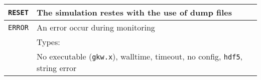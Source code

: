 \begin{center}
\begin{tabular}{l | l}
        \texttt{RESET}    & The simulation restes with the use of dump files                                                \\\hline 
        \texttt{ERROR}    & An error occur during monitoring                                                                \\
                          & Types:                                                                                          \\
                          & No executable (\texttt{gkw.x}), walltime, timeout, no config, \texttt{hdf5}, string error       \\
    \end{tabular}
    \label{tab:statusTypes}
\end{center}

